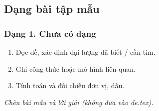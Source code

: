 

\subsection{Dạng bài tập mẫu}
\subsubsection{Dạng 1. Chưa có dạng}
\begin{phuongphap}
\begin{enumerate}
\item Đọc đề, xác định đại lượng đã biết / cần tìm.
\item Ghi công thức hoặc mô hình liên quan.
\item Tính toán và đối chiếu đơn vị, dấu.
\end{enumerate}
\end{phuongphap}
\begin{vidumau}
\textit{Chèn bài mẫu và lời giải (không đưa vào de.tex).}
\end{vidumau}

